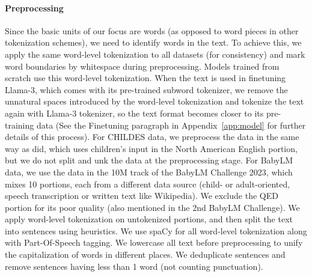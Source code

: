\documentclass{article}
\begin{document}
\paragraph{Preprocessing}
Since the basic units of our focus are words (as opposed to word pieces in other tokenization schemes), we need to identify words in the text.
To achieve this, we apply the same word-level tokenization to all datasets (for consistency) and mark word boundaries by whitespace during preprocessing.
Models trained from scratch use this word-level tokenization.
When the text is used in finetuning \mbox{Llama-3}, which comes with its pre-trained subword tokenizer, we remove the unnatural spaces introduced by the word-level tokenization and tokenize the text again with \mbox{Llama-3} tokenizer, so the text format becomes closer to its pre-training data (See the Finetuning paragraph in Appendix~\ref{app:model} for further details of this process).
For CHILDES data, we preprocess the data in the same way as \citet{yedetore-etal-2023-poor} did, which uses children's input in the North American English portion, but we do not split and unk the data at the preprocessing stage.
For BabyLM data, we use the data in the 10M track of the BabyLM Challenge 2023, which mixes 10 portions, each from a different data source (child- or adult-oriented, speech transcription or written text like Wikipedia). We exclude the QED portion for its poor quality (also mentioned in the 2nd BabyLM Challenge). We apply word-level tokenization on untokenized portions, and then split the text into sentences using heuristics.
We use spaCy for all word-level tokenization along with Part-Of-Speech tagging.
We lowercase all text before preprocessing to unify the capitalization of words in different places.
We deduplicate sentences and remove sentences having less than 1 word (not counting punctuation).
\end{document}
